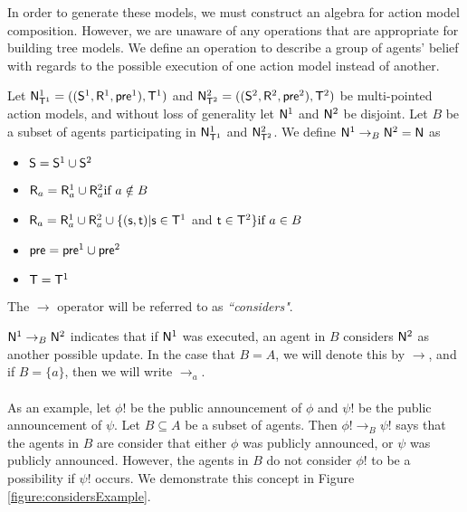 In order to generate these models, we must construct an algebra for action model composition.
However, we are unaware of any operations that are appropriate for building tree models.
We define an operation to describe a group of agents' belief with regards to the possible execution
of one action model instead of another.

\begin{defn} \label{considers}
Let $\mathrm{\mathsf{N}}^1_{\mathrm{\mathsf{T}}^1} = ((\mathrm{\mathsf{S}}^1, \mathrm{\mathsf{R}}^1, \mathrm{\mathsf{pre}}^1), \mathrm{\mathsf{T}}^1)$ and $\mathrm{\mathsf{N}}^2_{\mathrm{\mathsf{T}}^2} = ((\mathrm{\mathsf{S}}^2,
	\mathrm{\mathsf{R}}^2, \mathrm{\mathsf{pre}}^2),\mathrm{\mathsf{T}}^2)$ be multi-pointed action models, and without loss of generality let $\mathrm{\mathsf{N}}^1$ and
$\mathrm{\mathsf{N}}^2$ be disjoint.
Let $B$ be a subset of agents participating in $\mathrm{\mathsf{N}}^1_{\mathrm{\mathsf{T}}^1}$ and $\mathrm{\mathsf{N}}^2_{\mathrm{\mathsf{T}}^2}$.
We define $\mathrm{\mathsf{N}}^1 \to_B \mathrm{\mathsf{N}}^2 = \mathrm{\mathsf{N}}$ as 
\begin{itemize}
  \item $\mathrm{\mathsf{S}} = \mathrm{\mathsf{S}}^1 \cup \mathrm{\mathsf{S}}^2$
  \item $\mathrm{\mathsf{R}}_a = \mathrm{\mathsf{R}}^1_a \cup \mathrm{\mathsf{R}}^2_a \text{if } a \notin B$
	\item $\mathrm{\mathsf{R}}_a =
      \mathrm{\mathsf{R}}^1_a \cup
      \mathrm{\mathsf{R}}^2_a \cup
      \{(\mathrm{\mathsf{s}},\mathrm{\mathsf{t}}) | \mathrm{\mathsf{s}} \in \mathrm{\mathsf{T}}^1$ and $\mathrm{\mathsf{t}} \in \mathrm{\mathsf{T}}^2 \}
    \text{if } a \in B $
  \item $\mathrm{\mathsf{pre}} = \mathrm{\mathsf{pre}}^1 \cup \mathrm{\mathsf{pre}}^2$
  \item $\mathrm{\mathsf{T}} = \mathrm{\mathsf{T}}^1$
\end{itemize}
The $\to$ operator will be referred to as {\em ``considers"}.
\end{defn}

$\mathrm{\mathsf{N}}^1 \to_B \mathrm{\mathsf{N}}^2$ indicates that if $\mathrm{\mathsf{N}}^1$ was executed, an agent in $B$ considers $\mathrm{\mathsf{N}}^2$ as another
possible update.
In the case that $B = A$, we will denote this by $\to$, and if $B = \{a\}$, then
we will write $\to_a$.\\
\\
As an example, let $\phi!$ be the public announcement of $\phi$ and $\psi!$ be the public announcement
of $\psi$.
Let $B \subseteq A$ be a subset of agents.
Then $\phi! \to_B \psi!$ says that the agents in $B$ are consider that either $\phi$ was publicly
announced, or $\psi$ was publicly announced.
However, the agents in $B$ do not consider $\phi!$ to be a possibility if $\psi!$ occurs.
We demonstrate this concept in Figure \ref{figure:considersExample}.

